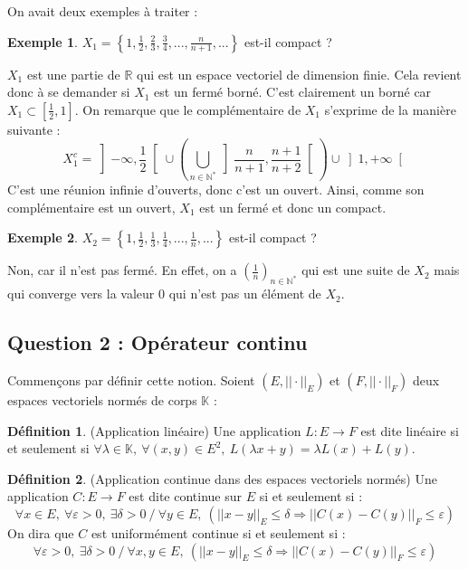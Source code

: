 \documentclass[a4paper,11pt]{article}
\theoremstyle{plain}
\theoremstyle{definition}
\newtheorem*{defi}{Définition}
\newtheorem*{expl}{Exemple}
\begin{document}
On avait deux exemples à traiter :
\begin{expl}
$X_{1} = \left\{1, \frac{1}{2}, \frac{2}{3}, \frac{3}{4}, ... , \frac{n}{n+1}, ...\right\}$ est-il compact ?
\end{expl}
$X_{1}$ est une partie de $\mathbb{R}$ qui est un espace vectoriel de dimension finie. 
Cela revient donc à se demander si $X_{1}$ est un fermé borné.
C'est clairement un borné car $X_{1} \subset \left[\frac{1}{2}, 1\right]$.
On remarque que le complémentaire de $X_{1}$ s'exprime de la manière suivante : 
\[
	X_{1}^{c} = \left]-\infty, \frac{1}{2}\right[\cup \left(\bigcup_{n \in \mathbb{N}^*} \left]\frac{n}{n+1}, \frac{n+1}{n+2}\right[\right) \cup \left]1, +\infty\right[
\]
C'est une réunion infinie d'ouverts, donc c'est un ouvert.
Ainsi, comme son complémentaire est un ouvert, $X_{1}$ est un fermé et donc un compact.

\begin{expl}
$X_{2} = \left\{1, \frac{1}{2}, \frac{1}{3}, \frac{1}{4}, ... , \frac{1}{n}, ...\right\}$ est-il compact ?
\end{expl}
Non, car il n'est pas fermé.
En effet, on a $\left(\frac{1}{n}\right)_{n \in \mathbb{N}^*}$ qui est une suite de $X_{2}$ mais qui converge vers la valeur $0$ qui n'est pas un élément de $X_{2}$.

\subsection*{Question 2 : Opérateur continu}
Commençons par définir cette notion. Soient $\left(E, ||\cdot||_{E}\right)$ et $\left(F, ||\cdot||_{F}\right)$ deux espaces vectoriels normés de corps $\mathbb{K}$ :
\begin{defi} (Application linéaire)
Une application $L : E \to F$ est dite linéaire si et seulement si $\forall \lambda \in \mathbb{K}, \ \forall \left(x,y\right) \in E^2, \ L\left(\lambda x + y\right) = \lambda L\left(x\right) + L\left(y\right)$.
\end{defi}

\begin{defi} (Application continue dans des espaces vectoriels normés)
Une application $C : E \to F$ est dite continue sur $E$ si et seulement si :
\[
\forall x \in E, \ \forall \varepsilon > 0, \ \exists \delta > 0 \ / \ \forall y \in E, \ \left(||x-y||_{E} \leq \delta \Rightarrow ||C(x) - C(y)||_{F} \leq \varepsilon \right)
\]
On dira que $C$ est uniformément continue si et seulement si :
\[
\forall \varepsilon > 0, \ \exists \delta > 0 \ / \ \forall x,y \in E, \ \left(||x-y||_{E} \leq \delta \Rightarrow ||C(x) - C(y)||_{F} \leq \varepsilon \right)
\]
\end{defi}
\end{document}
